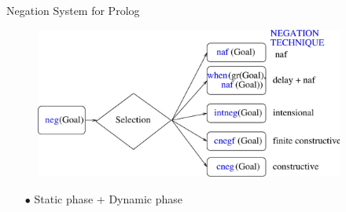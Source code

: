 \documentclass[pdf,slideColor,contemporain]{prosper}
\begin{document}
\begin{slide}{Negation System for Prolog}

  \begin{figure}
        \centering
        \includegraphics[width=4in]{modules.eps} 
  \end{figure}
\vspace{-0.5cm}
      \begin{itemize}
                \item[{\blue $\bullet$}] Static phase + Dynamic phase
      \end{itemize}

\end{slide}



\maketitle
\end{document}
